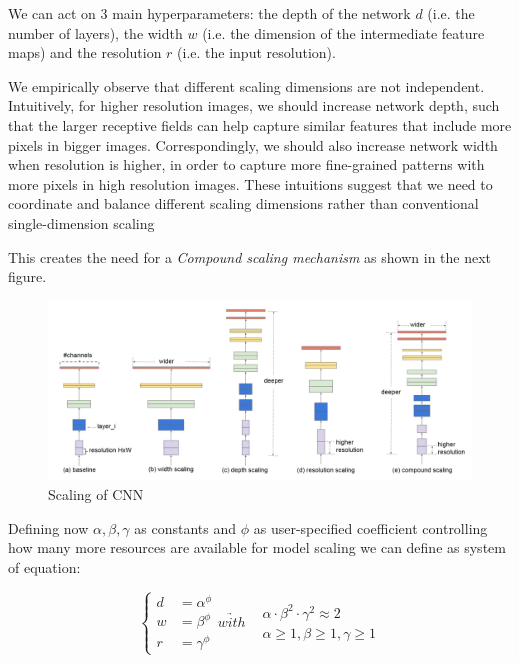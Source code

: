 \documentclass{article}
\begin{document}
        We can act on 3 main hyperparameters: the depth of the network $d$ (i.e. the number of layers), the width $w$ (i.e. the dimension of the intermediate feature maps) and the resolution $r$ (i.e. the input resolution).

        We empirically observe that different scaling dimensions are not independent. Intuitively, for higher resolution images, we should increase network depth, such that the larger receptive fields can help capture similar features that include
        more pixels in bigger images. Correspondingly, we should also increase network width when resolution is higher, in order to capture more fine-grained patterns with more pixels
        in high resolution images. These intuitions suggest that we need to coordinate and balance different scaling dimensions rather than conventional single-dimension scaling

        This creates the need for a \emph{Compound scaling mechanism} as shown in the next figure.
        
        \begin{figure}[H]
          \includegraphics[scale=0.35]{../Images/ENetScaling.png}
          \centering
          \caption{Scaling of CNN}
        \end{figure}

        Defining now $\alpha, \beta, \gamma$ as constants and $\phi$ as user-specified coefficient controlling how many more resources are available for model scaling we can define as system of equation:

        \begin{equation}
          \left\{\begin{array}{cl}
            d & = \alpha^\phi \\
            w & = \beta^\phi  \\
            r & = \gamma^\phi
           \end{array}\right.
           \underrightarrow{with}
           \begin{array}{cl}
            &\alpha\cdot\beta^2\cdot\gamma^2 \approx 2 \\
            &\alpha \ge 1, \beta\ge 1,\gamma\ge 1
           \end{array}
        \end{equation}
\end{document}
